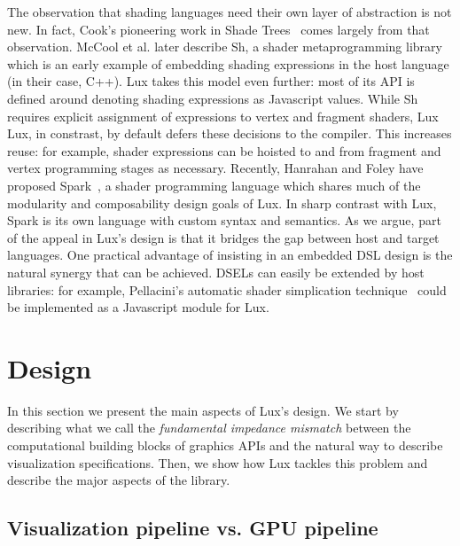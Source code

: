The observation that shading languages need their own layer of
abstraction is not new. In fact, Cook's pioneering work in Shade
Trees~\cite{Cook:1984:ST} comes largely from that observation.
%
McCool et al. later describe Sh, a shader metaprogramming
library~\cite{McCool:2002:SM} which is an early example
of embedding shading expressions in the host language
(in their case, C++). 
%
Lux takes this model even further:
most of its API is defined around denoting shading expressions
as Javascript values. While Sh requires explicit assignment of
expressions to vertex and fragment shaders, Lux 
%
Lux, in constrast, by default defers these decisions to the
compiler. This increases reuse: for example,
shader expressions can be hoisted to and from fragment and vertex
programming stages as necessary.
%
Recently,
Hanrahan and Foley have proposed Spark~\cite{Foley:2011:SMC}, a shader
programming language which shares much of the modularity and
composability design goals of Lux. 
%
In sharp contrast with Lux,
Spark is its own language with custom syntax and semantics. 
%
As we argue, part of the appeal in Lux's design is that it bridges
the gap between host and target languages. %
%
%
One practical advantage of insisting in an embedded DSL design is the
natural synergy that can be achieved. DSELs can easily be extended by host
libraries: for example, Pellacini's automatic shader simplication
technique~\cite{Pellacini:2005:UCA} could be implemented as a Javascript
module for Lux.


\section{Design\label{sec:design}}

In this section we present the main aspects of Lux's design. We
start by describing what we call the \emph{fundamental impedance
mismatch} between the computational building blocks of graphics APIs
and the natural way to describe visualization specifications. Then, we
show how Lux tackles this problem and describe the major aspects of
the library.

\subsection{Visualization pipeline vs. GPU pipeline\label{sec:mismatch}}

